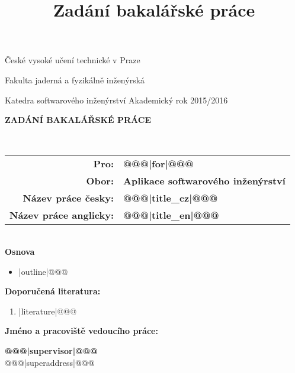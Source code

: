 \documentclass[a4paper,11pt,twoside,final]{article}
\title{Zadání bakalářské práce}
\begin{document}
\begin{titlepage}

\begin{center}
  \begin{huge}
		České vysoké učení technické v Praze\par
		Fakulta jaderná a fyzikálně inženýrská
  \end{huge}
\end{center}

\vspace{5mm}
Katedra softwarového inženýrství \hfill     Akademický rok 2015/2016\\[2cm]

\begin{center}
  \begin{huge}
    \textbf{ZADÁNÍ BAKALÁŘSKÉ PRÁCE}
  \end{huge}
\\[2cm]
\end{center}


\begin{tabularx}{\textwidth}{rl}
\textbf{Pro:} & \textbf{@@@|for|@@@}\\[0.3cm]
\textbf{Obor:} & \textbf{Aplikace softwarového inženýrství}\\[0.3cm]
\textbf{Název práce česky:} & \textbf{@@@|title_cz|@@@}\\[0.3cm]
\textbf{Název práce anglicky:} & \textbf{@@@|title_en|@@@}
\end{tabularx}
\\[4cm]

\textbf{Osnova}

\vspace{5pt}
\begin{itemize}
@@@\item |outline|@@@
\end{itemize}

\newpage
\pagestyle{empty}

\textbf{Doporučená literatura:}

\leftmargini=13pt
\begin{enumerate}
@@@\item |literature|@@@
\end{enumerate}

\vfill
\textbf{Jméno a pracoviště vedoucího práce:}

\textbf{@@@|supervisor|@@@} \\
@@@|superaddress|@@@ \\
\par
\hfill
\begin{minipage}{0.3\textwidth}


\end{minipage}
\end{titlepage}
\end{document}
